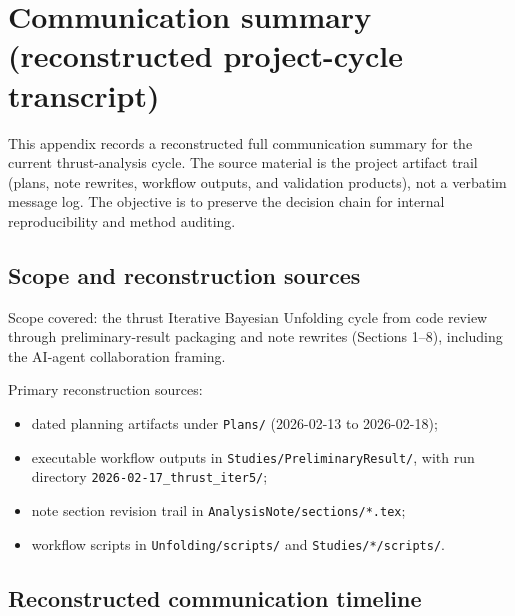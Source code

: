 \section{Communication summary (reconstructed project-cycle transcript)}
\label{sec:app_communication_summary}

This appendix records a reconstructed full communication summary for the current thrust-analysis cycle.
The source material is the project artifact trail (plans, note rewrites, workflow outputs, and validation products), not a verbatim message log.
The objective is to preserve the decision chain for internal reproducibility and method auditing.

\subsection{Scope and reconstruction sources}

Scope covered: the thrust Iterative Bayesian Unfolding cycle from code review through preliminary-result packaging and note rewrites (Sections 1--8), including the AI-agent collaboration framing.

Primary reconstruction sources:
\begin{itemize}
\item dated planning artifacts under \texttt{Plans/} (2026-02-13 to 2026-02-18);
\item executable workflow outputs in \texttt{Studies/PreliminaryResult/}, with run directory \texttt{2026-02-17\_thrust\_iter5/};
\item note section revision trail in \texttt{AnalysisNote/sections/*.tex};
\item workflow scripts in \texttt{Unfolding/scripts/} and \texttt{Studies/*/scripts/}.
\end{itemize}

\subsection{Reconstructed communication timeline}

